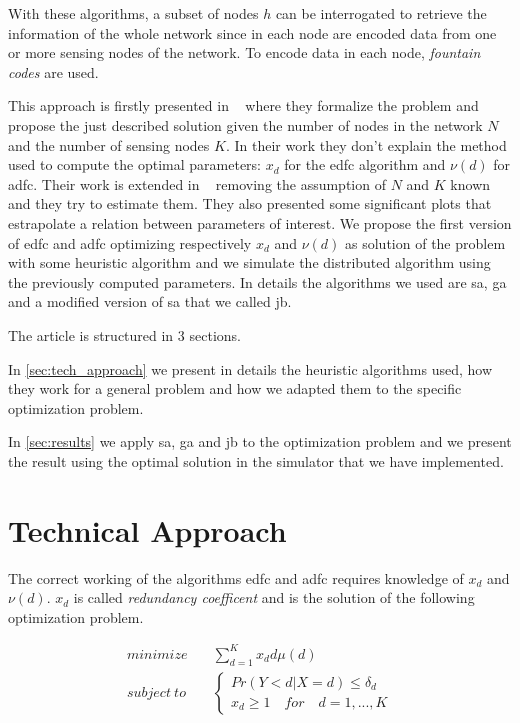 \documentclass[journal]{IEEEtran}
\begin{document}
With these algorithms, a subset of nodes $h$ can be interrogated to retrieve the information of the whole network since in each node are encoded data from one or more sensing nodes of the network.
To encode data in each node, \textit{fountain codes} are used.

This approach is firstly presented in ~\cite{Lin2007} where they formalize the problem and propose the just described solution given the number of nodes in the network $N$ and the number of sensing nodes $K$. In their work they don't explain the method used to compute the optimal parameters: $x_d$ for the \gls{edfc} algorithm and $\nu(d)$ for \gls{adfc}. Their work is extended in ~\cite{Aly2008} removing the assumption of $N$ and $K$ known and they try to estimate them.
They also presented some significant plots that estrapolate a relation between parameters of interest.
We propose the first version of \gls{edfc} and \gls{adfc} optimizing respectively $x_d$ and $\nu(d)$ as solution of the problem with some heuristic algorithm and we simulate the distributed algorithm using the previously computed parameters.
In details the algorithms we used are \gls{sa}, \gls{ga} and a modified version of \gls{sa} that we called \gls{jb}.

The article is structured in 3 sections.

In \autoref{sec:tech_approach} we present in details the heuristic algorithms used, how they work for a general problem and how we adapted them to the specific optimization problem.

In \autoref{sec:results} we apply \gls{sa}, \gls{ga} and \gls{jb} to the optimization problem and we present the result using the optimal solution in the simulator that we have implemented.

\section{Technical Approach}
\label{sec:tech_approach}

The correct working of the algorithms \gls{edfc} and \gls{adfc} requires knowledge of $x_d$ and $\nu(d)$. $x_d$ is called \textit{redundancy coefficent} and is the solution of the following optimization problem.

\begin{equation}
	\label{firstproblem}
	\begin{split}
		minimize & \quad \sum_{d=1}^K x_d d \mu (d) \\
		subject \ to & \quad \begin{cases}
			Pr(Y<d|X=d) \leq \delta_d \\
			x_d \geq 1 \quad for \quad d = 1,...,K
		\end{cases}
	\end{split}
\end{equation}
\end{document}
